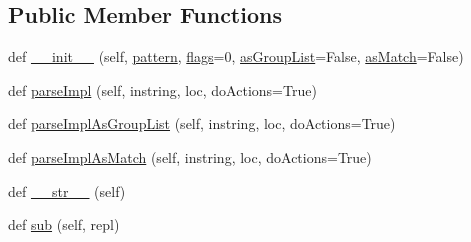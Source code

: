 \subsection*{Public Member Functions}
\begin{DoxyCompactItemize}
\item 
def \hyperlink{classpyparsing_1_1Regex_ac3a7dea3a71304b85281af75207c42cf}{\+\_\+\+\_\+init\+\_\+\+\_\+} (self, \hyperlink{classpyparsing_1_1Regex_abb03224d25c9d44c8f05196aa4b3ab59}{pattern}, \hyperlink{classpyparsing_1_1Regex_a1513664a667650fd7ab74ee9a06314e7}{flags}=0, \hyperlink{classpyparsing_1_1Regex_a2aa294b82c85a3c8201aceaf9e88e98c}{as\+Group\+List}=False, \hyperlink{classpyparsing_1_1Regex_a5ac786a184a9f8a86abb05d98b7aabe8}{as\+Match}=False)
\item 
def \hyperlink{classpyparsing_1_1Regex_a582c5e478eb35d197f455116efb7fd38}{parse\+Impl} (self, instring, loc, do\+Actions=True)
\item 
def \hyperlink{classpyparsing_1_1Regex_aba5fff9cb8e4eaaa7eca1da894a9b2a1}{parse\+Impl\+As\+Group\+List} (self, instring, loc, do\+Actions=True)
\item 
def \hyperlink{classpyparsing_1_1Regex_a68a84127274ff9f440af354b62c5adb5}{parse\+Impl\+As\+Match} (self, instring, loc, do\+Actions=True)
\item 
def \hyperlink{classpyparsing_1_1Regex_a3d6bf00b8b8327de50d45b28dba62166}{\+\_\+\+\_\+str\+\_\+\+\_\+} (self)
\item 
def \hyperlink{classpyparsing_1_1Regex_af31e2a3be906135d8e88ac52ef8aaaef}{sub} (self, repl)
\end{DoxyCompactItemize}
